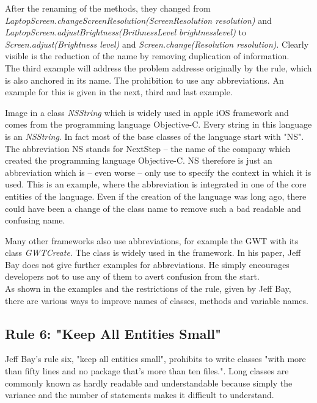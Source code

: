 After the renaming of the methods, they changed from \\ \textit{LaptopScreen.changeScreenResolution(ScreenResolution resolution)}  and \\\textit{LaptopScreen.adjustBrightness(BrithnessLevel brightnesslevel)} to \textit{Screen.adjust(Brightness level)} and \textit{Screen.change(Resolution resolution)}. Clearly visible is the reduction of the name by removing duplication of information. 
\\

The third example will address the problem addresse originally by the rule, which is also anchored in its name. The prohibition to use any abbreviations. An example for this is given in the next, third and last example. 

Image in a class \textit{NSString} which is widely used in apple iOS framework and comes from the programming language Objective-C. Every string in this language is an \textit{NSString}. In fact most of the base classes of the language start with "NS". The abbreviation NS stands for NextStep -- the name of the company which created the programming language Objective-C. NS therefore is just an abbreviation which is -- even worse -- only use to specify the context in which it is used. This is an example, where the abbreviation is integrated in one of the core entities of the language. Even if the creation of the language was long ago, there could have been a change of the class name to remove such a bad readable and confusing name.

Many other frameworks also use abbreviations, for example the \ac{GWT} with its class \textit{GWTCreate}. The class is widely used in the framework. In his paper, Jeff Bay does not give further examples for abbreviations. He simply encourages developers not to use any of them to avert confusion from the start.
\\

As shown in the examples and the restrictions of the rule, given by Jeff Bay, there are various ways to improve names of classes, methods and variable names. 

\subsection*{Rule 6: "Keep All Entities Small"}
Jeff Bay's rule six, "keep all entities small", prohibits to write classes "with more than fifty lines and no package that's more than ten files.". Long classes are commonly known as hardly readable and understandable because simply the variance and the number of statements makes it difficult to understand. 
\\

